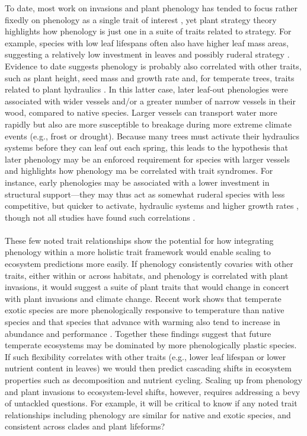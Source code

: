 \documentclass[11pt,a4paper,oneside]{article}
\begin{document}
To date, most work on invasions and plant phenology has tended to focus rather fixedly on phenology as a single trait of interest \citep[but see][]{Sun:2011eu,hahn2012}, yet plant strategy theory \citep{crainebook} highlights how phenology is just one in a suite of traits related to strategy. For example, species with low leaf lifespans often also have higher leaf mass areas, suggesting a relatively low investment in leaves and possibly ruderal strategy \citep{Mack:1996ly}. Evidence to date suggests phenology is probably also correlated with other traits, such as plant height, seed mass \citep{Bolmgren:2008vo} and growth rate \citep{Sun:2011eu} and, for temperate trees, traits related to plant hydraulics \citep{Lechowicz:1984cr}. In this latter case, later leaf-out phenologies were associated with wider vessels and/or a greater number of narrow vessels in their wood, compared to native species. Larger vessels can transport water more rapidly but also are more susceptible to breakage during more extreme climate events (e.g., frost or drought). Because many trees must activate their hydraulics systems before they can leaf out each spring, this leads to the hypothesis \citep{Lechowicz:1984cr}
that later phenology may be an enforced requirement for species with larger vessels and highlights how phenology ma be correlated with trait syndromes. For instance, early phenologies may be associated with a lower investment in structural support---they may thus act as somewhat ruderal species with less competitive, but quicker to activate, hydraulic systems \citep{Lechowicz:1984cr} and higher growth rates \citep{Sun:2011eu,hahn2012}, though not all studies have found such correlations \citep[e.g.,][]{Craine:2012kl}.\\
\\
These few noted trait relationships show the potential for how integrating phenology within a more holistic trait framework would enable scaling to ecosystem predictions more easily. If phenology consistently covaries with other traits, either within or across habitats, and phenology is correlated with plant invasions, it would suggest a suite of plant traits that would change in concert with plant invasions and climate change. Recent work shows that temperate exotic species are more phenologically responsive to temperature than native species and that species that advance with warming also tend to increase in abundance and performance \citep{Cleland:2012vn}. Together these findings suggest that future temperate ecosystems may be dominated by more phenologically plastic species. If such flexibility correlates with other traits (e.g., lower leaf lifespan or lower nutrient content in leaves) we would then predict cascading shifts in ecosystem properties such as decomposition and nutrient cycling. Scaling up from phenology and plant invasions to ecosystem-level shifts, however, requires addressing a bevy of untackled questions. For example, it will be critical to know if any noted trait relationships including phenology are similar for native and exotic species, and consistent across clades and plant lifeforms? \\
\end{document}
